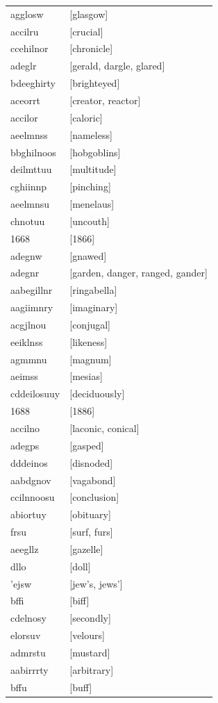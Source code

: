 \documentclass{article}
\begin{document}
\begin{tabular}{ll}
agglosw & [glasgow] \\
accilru & [crucial] \\
ccehilnor & [chronicle] \\
adeglr & [gerald, dargle, glared] \\
bdeeghirty & [brighteyed] \\
aceorrt & [creator, reactor] \\
accilor & [caloric] \\
aeelmnss & [nameless] \\
bbghilnoos & [hobgoblins] \\
deilmttuu & [multitude] \\
cghiinnp & [pinching] \\
aeelmnsu & [menelaus] \\
chnotuu & [uncouth] \\
1668 & [1866] \\
adegnw & [gnawed] \\
adegnr & [garden, danger, ranged, gander] \\
aabegillnr & [ringabella] \\
aagiimnry & [imaginary] \\
acgjlnou & [conjugal] \\
eeiklnss & [likeness] \\
agmmnu & [magnum] \\
aeimss & [mesias] \\
cddeilosuuy & [deciduously] \\
1688 & [1886] \\
accilno & [laconic, conical] \\
adegps & [gasped] \\
dddeinos & [disnoded] \\
aabdgnov & [vagabond] \\
ccilnnoosu & [conclusion] \\
abiortuy & [obituary] \\
frsu & [surf, furs] \\
aeegllz & [gazelle] \\
dllo & [doll] \\
'ejsw & [jew's, jews'] \\
bffi & [biff] \\
cdelnosy & [secondly] \\
elorsuv & [velours] \\
admrstu & [mustard] \\
aabirrrty & [arbitrary] \\
bffu & [buff] \\

\end{tabular}
\end{document}
